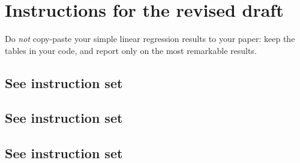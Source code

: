 %
%
%
\section{Instructions for the revised draft}%
  \label{sec:draft2}%

  Do \emph{not} copy-paste your simple linear regression results to your paper: keep the tables in your code, and report only on the most remarkable results.%

	\subsection{See instruction set}

	\subsection{See instruction set}

	\subsection{See instruction set}